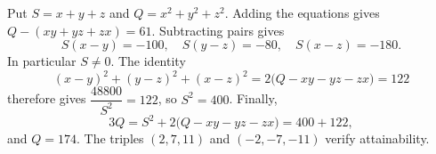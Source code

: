 Put $S=x+y+z$ and $Q=x^2+y^2+z^2$. Adding the equations gives $Q-(xy+yz+zx)=61$. Subtracting pairs gives
\[
S(x-y)=-100,\quad S(y-z)=-80,\quad S(x-z)=-180.
\]
In particular $S\ne0$. The identity
\[
(x-y)^2+(y-z)^2+(x-z)^2=2\bigl(Q-xy-yz-zx\bigr)=122
\]
therefore gives $\dfrac{48800}{S^2}=122$, so $S^2=400$. Finally,
\[
3Q=S^2+2\bigl(Q-xy-yz-zx\bigr)=400+122,
\]
and $\boxed{Q=174}$. The triples $(2,7,11)$ and $(-2,-7,-11)$ verify attainability.
